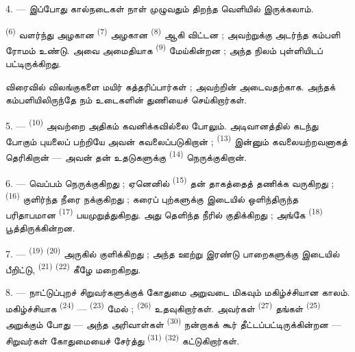 4. --- இப்போது கால்நடைகள் நாள் முழுவதும் திறந்த வெளியில் இருக்கலாம்.

 \textsuperscript{(6)} வளர்ந்து அழகான
 \textsuperscript{(7)} அழகான
 \textsuperscript{(8)} ஆகி விட்டன ;
அவற்றுக்கு அடர்ந்த கம்பளி ரோமம் உண்டு. அவை அமைதியாக
 \textsuperscript{(9)} 
மேய்கின்றன ; அந்த நிலம்  புள்ளியிடப்
பட்டிருக்கிறது.

விரைவில்  விலங்குகளை மயிர் கத்தரிப்பார்கள் ; அவற்றின்
 அடைவதற்காக. அந்தக் கம்பளியிலிருந்தே நம் உடைகளின்
துணியைச் செய்கிறார்கள்.

\VUsaut{5.0mm}
\VUsaut{3.4mm}

5. ---  \textsuperscript{(10)} அவற்றை அதிகம்
கவனிக்கவில்லை போலும். அடிவானத்தில் கடந்து போகும் புயலைப் பற்றியே
அவன் கவலைப்படுகிறான் ;  \textsuperscript{(13)}
இன்னும் கவலையற்றவனாகத் தெரிகிறான் — அவன் தன் உதடுகளுக்கு
 \textsuperscript{(14)} நெருக்குகிறான்.

6. --- வெப்பம் நெருக்குகிறது ; ஏனெனில் 
\textsuperscript{(15)} தன் தாகத்தைத் தணிக்க வருகிறது ;
 \textsuperscript{(16)} குளிர்ந்த நீரை நக்குகிறது ;
கரைப் புற்களுக்கு இடையில் ஒளிந்திருந்த பரிதாபமான  \textsuperscript{(17)} பயமுறுத்துகிறது. அது தெளிந்த நீரில்
குதிக்கிறது ; அங்கே  \textsuperscript{(18)}
பூத்திருக்கின்றன.

7. ---  \textsuperscript{(19)}  \textsuperscript{(20)} அருகில் குளிக்கிறது ; அந்த ஊற்று
இரண்டு பாறைகளுக்கு இடையில் பீறிட்டு, 
\textsuperscript{(21)} 
\textsuperscript{(22)} கீழே மறைகிறது.

\VUsaut{5.0mm}
\VUsaut{3.4mm}

8. --- நாட்டுப்புறச் சிறுவர்களுக்குக் கோதுமை அறுவடை மிகவும் மகிழ்ச்சியான
காலம். மகிழ்ச்சியாக  \textsuperscript{(24)} —
 \textsuperscript{(23)} மேல் ;
 \textsuperscript{(26)} உதவுகிறார்கள். அவர்கள்
 \textsuperscript{(27)} தங்கள்  \textsuperscript{(25)} அறுக்கும் போது — அந்த அரிவாள்கள்
 \textsuperscript{(30)} நன்றாகக் கூர்
தீட்டப்பட்டிருக்கின்றன — சிறுவர்கள் கோதுமையைச் சேர்த்து
 \textsuperscript{(31)}  \textsuperscript{(32)} கட்டுகிறார்கள்.

